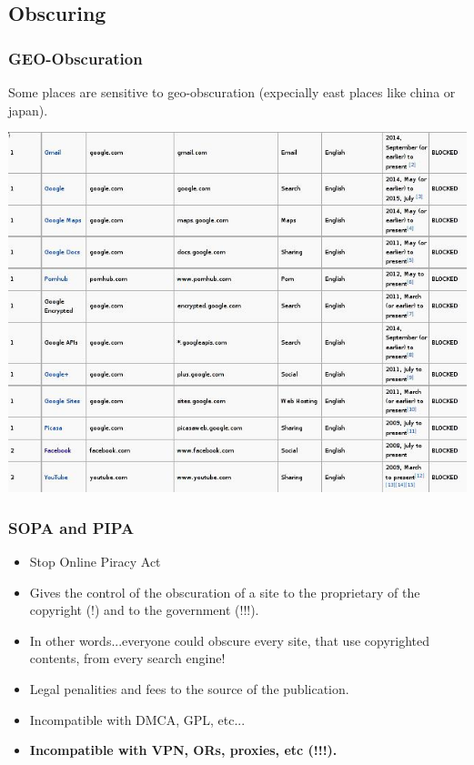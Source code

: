 \subsection{Obscuring}
\begin{frame}
	\frametitle{GEO-Obscuration}

	\tiny{Some places are sensitive to geo-obscuration (expecially
	east places like china or japan).}\\
	\begin{center}
	\includegraphics[scale=0.3]{imgs/blocked_china}
	\end{center}
\end{frame}

\begin{frame}
	\frametitle{SOPA and PIPA}
	\begin{itemize}
		\item Stop Online Piracy Act
		\item Gives the control of the obscuration of a site to the
		proprietary of the copyright (!) and to the government (!!!).
		\item In other words...everyone could obscure every site, that
		use copyrighted contents, from every search engine!
		\item Legal penalities and fees to the source of the publication.
		\item Incompatible with DMCA, GPL, etc...
		\item \textbf{Incompatible with VPN, ORs, proxies, etc (!!!).}
	\end{itemize}
\end{frame}


